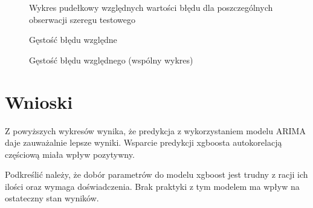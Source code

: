 \documentclass[11pt]{report}
\begin{document}
\begin{figure}[H]
    \centering
    \begin{subfigure}[b]{0.3\textwidth}
        \centering
        \def\svgwidth{\columnwidth}
        
    \end{subfigure}
    \begin{subfigure}[b]{0.3\textwidth}
        \centering
        \def\svgwidth{\columnwidth}
        
    \end{subfigure}
    \begin{subfigure}[b]{0.3\textwidth}
        \centering
        \def\svgwidth{\columnwidth}
        
    \end{subfigure}
     \caption{Wykres pudełkowy względnych wartości błędu dla poszczególnych obserwacji szeregu testowego}
\end{figure}

\begin{figure}[H]
    \centering
    \begin{subfigure}[b]{0.3\textwidth}
        \centering
        \def\svgwidth{\columnwidth}
        
    \end{subfigure}
    \begin{subfigure}[b]{0.3\textwidth}
        \centering
        \def\svgwidth{\columnwidth}
        
    \end{subfigure}
    \begin{subfigure}[b]{0.3\textwidth}
        \centering
        \def\svgwidth{\columnwidth}
        
    \end{subfigure}
     \caption{Gęstość błędu względne}
\end{figure}

\begin{figure}[H]
    \centering
    \centering
    \def\svgwidth{\columnwidth}
    
    \caption{Gęstość błędu względnego (wspólny wykres)}
\end{figure}

\section{Wnioski}
Z powyższych wykresów wynika, że predykcja z wykorzystaniem modelu ARIMA daje zauważalnie lepsze wyniki.
Wsparcie predykcji xgboosta autokorelacją częściową miała wpływ pozytywny.

Podkreślić należy, że dobór parametrów do modelu xgboost jest trudny z racji ich ilości oraz wymaga doświadczenia. 
Brak praktyki z tym modelem ma wpływ na ostateczny stan wyników.





\end{document}
